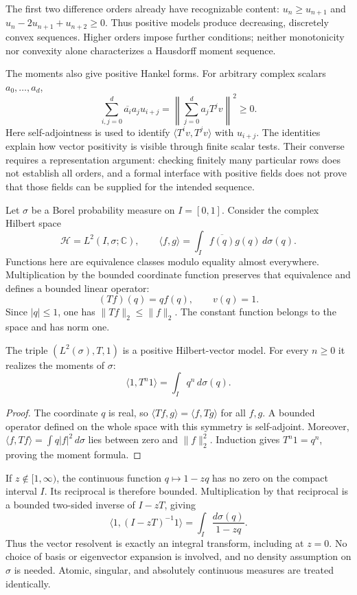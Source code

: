 The first two difference orders already have recognizable content:
$u_n\ge u_{n+1}$ and $u_n-2u_{n+1}+u_{n+2}\ge0$.
Thus positive models produce decreasing, discretely convex sequences.
Higher orders impose further conditions; neither monotonicity nor
convexity alone characterizes a Hausdorff moment sequence.

The moments also give positive Hankel forms. For arbitrary complex
scalars $a_0,\ldots,a_d$,
\[
 \sum_{i,j=0}^{d}\overline{a_i}a_j u_{i+j}
 =\left\|\sum_{j=0}^{d}a_jT^jv\right\|^2\ge0.
\]
Here self-adjointness is used to identify
$\langle T^iv,T^jv\rangle$ with $u_{i+j}$.
The identities explain how vector positivity is visible through
finite scalar tests. Their converse requires a representation
argument: checking finitely many particular rows does not establish
all orders, and a formal interface with positive fields does not
prove that those fields can be supplied for the intended sequence.

\label{hilb:multiplication}
Let $\sigma$ be a Borel probability measure on $I=[0,1]$. Consider
the complex Hilbert space
\[
 \mathcal H=L^2(I,\sigma;\mathbb C),\qquad
 \langle f,g\rangle=\int_I\overline{f(q)}g(q)\,d\sigma(q).
\]
Functions here are equivalence classes modulo equality almost
everywhere. Multiplication by the bounded coordinate function
preserves that equivalence and defines a bounded linear operator:
\[
 (Tf)(q)=qf(q),\qquad v(q)=1.
\]
Since $|q|\le1$, one has $\|Tf\|_2\le\|f\|_2$.
The constant function belongs to the space and has norm one.

\begin{proposition}\label{hilb:measure-realization}
The triple $(L^2(\sigma),T,1)$ is a positive Hilbert-vector model.
For every $n\ge0$ it realizes the moments of $\sigma$:
\[
 \langle 1,T^n1\rangle=\int_Iq^n\,d\sigma(q).
\]
\end{proposition}
\begin{proof}
The coordinate $q$ is real, so
$\langle Tf,g\rangle=\langle f,Tg\rangle$ for all $f,g$.
A bounded operator defined on the whole space with this symmetry
is self-adjoint. Moreover,
$\langle f,Tf\rangle=\int q|f|^2\,d\sigma$ lies between zero
and $\|f\|_2^2$. Induction gives $T^n1=q^n$, proving the
moment formula.
\end{proof}

If $z\notin[1,\infty)$, the continuous function
$q\mapsto1-zq$ has no zero on the compact interval $I$.
Its reciprocal is therefore bounded. Multiplication by that
reciprocal is a bounded two-sided inverse of $I-zT$, giving
\[
 \langle1,(I-zT)^{-1}1\rangle
 =\int_I\frac{d\sigma(q)}{1-zq}.
\]
Thus the vector resolvent is exactly an integral transform, including
at $z=0$. No choice of basis or eigenvector expansion is involved,
and no density assumption on $\sigma$ is needed. Atomic, singular,
and absolutely continuous measures are treated identically.

